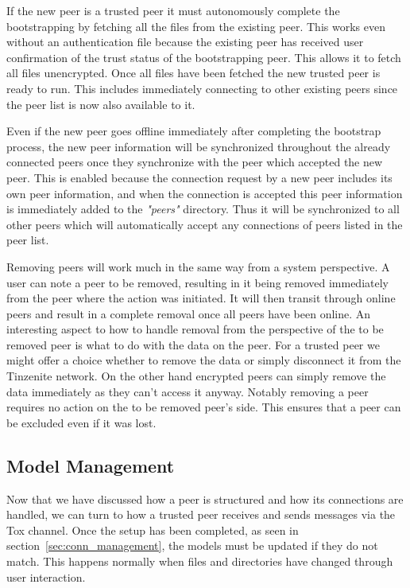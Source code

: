 If the new peer is a trusted peer it must autonomously complete the bootstrapping by fetching all the files from the existing peer.
This works even without an authentication file because the existing peer has received user confirmation of the trust status of the bootstrapping peer.
This allows it to fetch all files unencrypted.
Once all files have been fetched the new trusted peer is ready to run.
This includes immediately connecting to other existing peers since the peer list is now also available to it.

Even if the new peer goes offline immediately after completing the bootstrap process, the new peer information will be synchronized throughout the already connected peers once they synchronize with the peer which accepted the new peer.
This is enabled because the connection request by a new peer includes its own peer information, and when the connection is accepted this peer information is immediately added to the \textit{"peers"} directory.
Thus it will be synchronized to all other peers which will automatically accept any connections of peers listed in the peer list.

Removing peers will work much in the same way from a system perspective.
A user can note a peer to be removed, resulting in it being removed immediately from the peer where the action was initiated.
It will then transit through online peers and result in a complete removal once all peers have been online.
An interesting aspect to how to handle removal from the perspective of the to be removed peer is what to do with the data on the peer.
For a trusted peer we might offer a choice whether to remove the data or simply disconnect it from the Tinzenite network.
On the other hand encrypted peers can simply remove the data immediately as they can't access it anyway.
Notably removing a peer requires no action on the to be removed peer's side.
This ensures that a peer can be excluded even if it was lost.

\subsection{Model Management}
\label{sub:Model Management}

Now that we have discussed how a peer is structured and how its connections are handled, we can turn to how a trusted peer receives and sends messages via the Tox channel.
Once the setup has been completed, as seen in section~\ref{sec:conn_management}, the models must be updated if they do not match.
This happens normally when files and directories have changed through user interaction.

